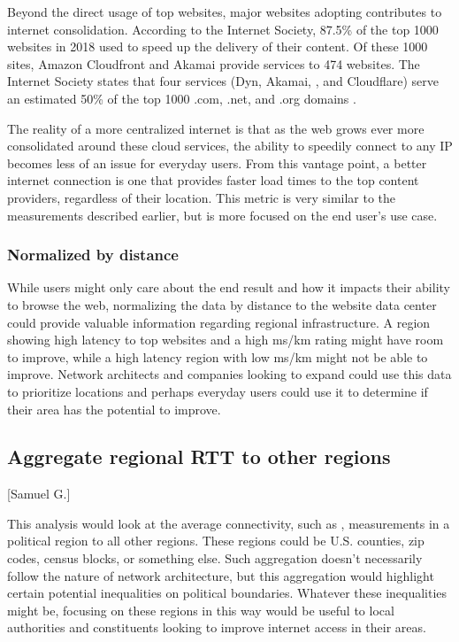 Beyond the direct usage of top websites, major websites adopting \cdns contributes to internet consolidation. According to the Internet Society, 87.5\% of the top 1000 websites in 2018 used \cdns to speed up the delivery of their content. Of these 1000 sites, Amazon Cloudfront and Akamai provide \cdn services to 474 websites. The Internet Society states that four services (Dyn, Akamai, \AWS, and Cloudflare) serve an estimated 50\% of the top 1000 .com, .net, and .org domains \cite{TheInternetSociety2019}.

The reality of a more centralized internet is that as the web grows ever more consolidated around these cloud services, the ability to speedily connect to any IP becomes less of an issue for everyday users. From this vantage point, a better internet connection is one that provides faster load times to the top content providers, regardless of their location. This metric is very similar to the \rtt measurements described earlier, but is more focused on the end user's use case.

\subsubsection{Normalized by distance}

While users might only care about the end result and how it impacts their ability to browse the web, normalizing the data by distance to the website data center could provide valuable information regarding regional infrastructure. A region showing high latency to top websites and a high ms/km rating might have room to improve, while a high latency region with low ms/km might not be able to improve. Network architects and companies looking to expand could use this data to prioritize locations and perhaps everyday users could use it to determine if their area has the potential to improve.

\subsection{Aggregate regional RTT to other regions}[Samuel G.]

This analysis would look at the average connectivity, such as \RTT, measurements in a political region to all other regions. These regions could be U.S. counties, zip codes, census blocks, or something else. Such aggregation doesn't necessarily follow the nature of network architecture, but this aggregation would highlight certain potential inequalities on political boundaries. Whatever these inequalities might be, focusing on these regions in this way would be useful to local authorities and constituents looking to improve internet access in their areas.

